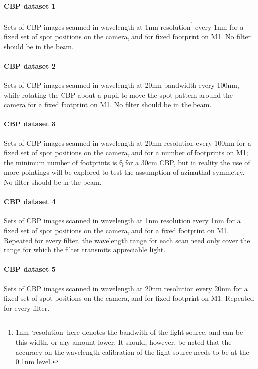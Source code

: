 \paragraph{CBP dataset 1}\label{sec:CPP:inputs:CBP:mono}
Sets of CBP images scanned in wavelength at 1nm resolution\footnote{1nm `resolution' here denotes the bandwith of the light source, and can be this width, or any amount lower. It should, however, be noted that the accuracy on the wavelength calibration of the light source needs to be at the 0.1nm level.} every 1nm for a fixed set of spot positions on the camera, and for fixed footprint on M1. No filter should be in the beam.

	
\paragraph{CBP dataset 2}\label{sec:CPP:inputs:CBP:spot}
Sets of CBP images scanned in wavelength at 20nm bandwidth every 100nm, while rotating the CBP about a pupil to move the spot pattern around the camera for a fixed footprint on M1. No filter should be in the beam.

	
\paragraph{CBP dataset 3}\label{sec:CPP:inputs:CBP:M1}
Sets of CBP images scanned in wavelength at 20nm resolution every 100nm for a fixed set of spot positions on the camera, and for a number of footprints on M1; the minimum number of footprints is \c 6 for a 30cm CBP, but in reality the use of more pointings will be explored to test the assumption of azimuthal symmetry. No filter should be in the beam.


\paragraph{CBP dataset 4}\label{sec:CPP:inputs:CBP:filter}
Sets of CBP images scanned in wavelength at 1nm resolution every 1nm for a fixed set of spot positions on the camera, and for a fixed footprint on M1. Repeated for every filter. \Nb the wavelength range for each scan need only cover the range for which the filter transmits appreciable light.


\paragraph{CBP dataset 5}\label{sec:CPP:inputs:CBP:leak}
Sets of CBP images scanned in wavelength at 20nm resolution every 20nm for a fixed set of spot positions on the camera, and for fixed footprint on M1. Repeated for every filter.


